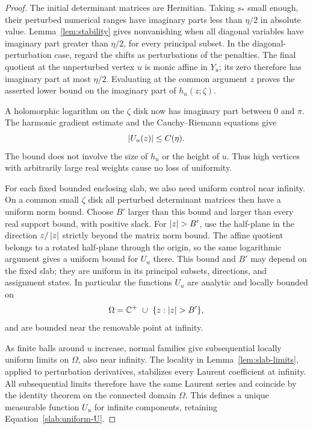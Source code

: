 \begin{proof}
The initial determinant matrices are Hermitian. Taking $s_*$ small
enough, their perturbed numerical ranges have imaginary parts less
than $\eta/2$ in absolute value. Lemma~\ref{lem:stability} gives
nonvanishing when all diagonal variables have imaginary part greater
than $\eta/2$, for every principal subset. In the diagonal-perturbation
case, regard the shifts as perturbations of the penalties. The final
quotient at the unperturbed vertex $u$ is monic affine in $Y_u$; its
zero therefore has imaginary part at most $\eta/2$. Evaluating at the
common argument $z$ proves the asserted lower bound on the imaginary
part of $h_u(z;\zeta)$.

A holomorphic logarithm on the $\zeta$ disk now has imaginary part
between $0$ and $\pi$. The harmonic gradient estimate and the
Cauchy--Riemann equations give
\begin{equation}
 \left|U_u(z)\right|\leq C(\eta).
 \label{slab:uniform-U}
\end{equation}
The bound does not involve the size of $h_u$ or the height of $u$.
Thus high vertices with arbitrarily large real weights cause no loss
of uniformity.

For each fixed bounded enclosing slab, we also need uniform control
near infinity. On a common small $\zeta$ disk all perturbed determinant
matrices then have a uniform norm bound. Choose $B'$ larger than this
bound and larger than every real support bound, with positive slack.
For $\abs{z}>B'$, use the half-plane in the direction $z/\left|z\right|$
strictly beyond the matrix norm bound. The affine quotient belongs
to a rotated half-plane through the origin, so the same logarithmic
argument gives a uniform bound for $U_u$ there. This bound and $B'$
may depend on the fixed slab; they are uniform in its principal
subsets, directions, and assignment states. In particular the
functions $U_u$ are analytic and locally bounded on
\begin{equation}
 \Omega=\C^+\ \cup\ \{z:\abs z>B'\},
 \label{slab:normal-domain}
\end{equation}
and are bounded near the removable point at infinity.

As finite balls around $u$ increase, normal families give
subsequential locally uniform limits on $\Omega$, also near infinity.
The locality in Lemma~\ref{lem:slab-limits}, applied to perturbation
derivatives, stabilizes every Laurent coefficient at infinity.
All subsequential limits therefore have the same Laurent series and
coincide by the identity theorem on the connected domain $\Omega$.
This defines a unique measurable function $U_u$ for infinite
components, retaining Equation~\eqref{slab:uniform-U}.


\end{proof}
